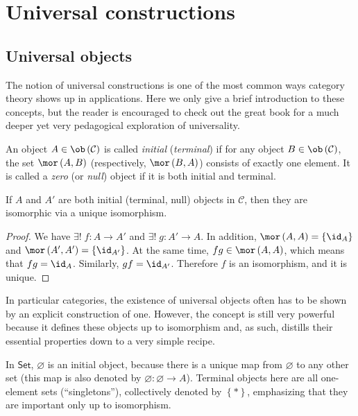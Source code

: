 






\section{Universal constructions}

\subsection{Universal objects}

The notion of universal constructions is one of the most common ways category theory shows up in applications. Here we only give a brief introduction to these concepts, but the reader is encouraged to check out the great book \cite{Bergman} for a much deeper yet very pedagogical exploration of universality.
\begin{defn}
    An object $A\in\ob\left(\mathcal{C}\right)$ is called \emph{initial}
    (\emph{terminal}) if for any object $B\in\ob\left(\mathcal{C}\right)$,
    the set $\mor\left(A,B\right)$ (respectively, $\mor\left(B,A\right)$)
    consists of exactly one element. It is called a \emph{zero} (or
    \emph{null}) object if it is both initial and terminal.
\end{defn}
\begin{prop}
    If $A$ and $A'$ are both initial (terminal, null) objects in $\mathcal{C}$,
    then they are isomorphic via a unique isomorphism.
\end{prop}
\begin{proof}
    We have $\exists!\;f:A\to A'$ and $\exists!\;g:A'\to A$. In addition,
    $\mor\left(A,A\right)=\left\{ \id_{A}\right\} $ and $\mor\left(A',A'\right)=\left\{ \id_{A'}\right\} $.
    At the same time, $fg\in\mor\left(A,A\right)$, which means that $fg=\id_{A}$.
    Similarly, $gf=\id_{A'}$. Therefore $f$ is an isomorphism, and it
    is unique.
\end{proof}
In particular categories, the existence of universal objects often has to be shown by an explicit construction of one. However, the concept is still very powerful because it defines these objects up to isomorphism and, as such, distills their essential properties down to a very simple recipe.
\begin{example}
    In $\mathsf{Set}$, $\varnothing$ is an initial object, because there
    is a unique map from $\varnothing$ to any other set (this map is
    also denoted by $\varnothing:\varnothing\to A$). Terminal objects
    here are all one-element sets (``singletons''), collectively denoted
    by $\left\{ \ast\right\} $, emphasizing that they are important only
    up to isomorphism.
\end{example}

